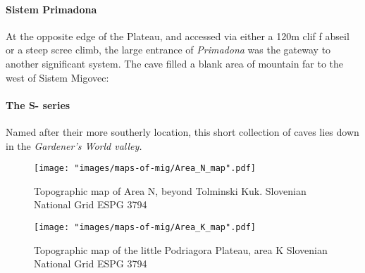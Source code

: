 \paragraph{Sistem Primadona} At the opposite edge of the Plateau, and accessed via either a 120m clif f abseil or a steep scree climb, the large entrance of \emph{Primadona} was the gateway to another significant system. The cave filled a blank area of mountain far to the west of Sistem Migovec: 

\paragraph{The S- series} Named after their more southerly location, this short collection of caves lies down in   the \emph{Gardener's World valley.}

 
 \begin{figure*}[t!]
 \checkoddpage \ifoddpage \forcerectofloat \else \forceversofloat \fi
\centering
  \texttt{[image: "images/maps-of-mig/Area\_N\_map".pdf]}
  \label{map m}
  \caption{Topographic map of Area N, beyond Tolminski Kuk. Slovenian National Grid ESPG 3794}
 \end{figure*}
 
 \begin{figure*}[t!]
 \checkoddpage \ifoddpage \forcerectofloat \else \forceversofloat \fi
\centering
  \texttt{[image: "images/maps-of-mig/Area\_K\_map".pdf]}
  \label{map m}
  \caption{Topographic map of the little Podriagora Plateau, area K Slovenian National Grid ESPG 3794}
 \end{figure*}
 
 